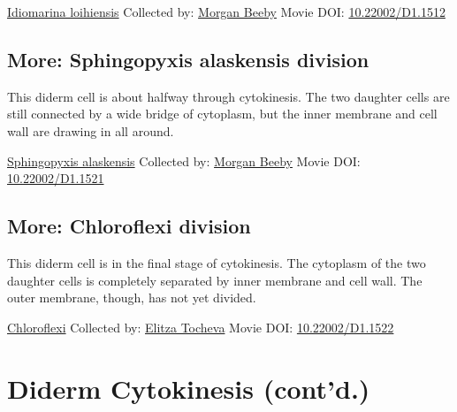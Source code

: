 \documentclass[]{tufte-book}
\begin{document}
\hypertarget{htmlwidget-65a7e8f4d70aea7fb400}{}

\label{fig:5-6}\protect\hyperlink{tree}{Idiomarina loihiensis} Collected by: \protect\hyperlink{morgan_beeby}{Morgan Beeby} Movie DOI: \href{https://doi.org/10.22002/D1.1512}{10.22002/D1.1512}

\hypertarget{Sphingopyxis_alaskensis_division}{%
\subsection*{More: Sphingopyxis alaskensis division}\label{Sphingopyxis_alaskensis_division}}

This diderm cell is about halfway through cytokinesis. The two daughter cells are still connected by a wide bridge of cytoplasm, but the inner membrane and cell wall are drawing in all around.



\hypertarget{htmlwidget-7d0bbe0364d702965563}{}

\label{fig:5-6a}\protect\hyperlink{tree}{Sphingopyxis alaskensis} Collected by: \protect\hyperlink{morgan_beeby}{Morgan Beeby} Movie DOI: \href{https://doi.org/10.22002/D1.1521}{10.22002/D1.1521}

\hypertarget{Chloroflexi_division}{%
\subsection*{More: Chloroflexi division}\label{Chloroflexi_division}}

This diderm cell is in the final stage of cytokinesis. The cytoplasm of the two daughter cells is completely separated by inner membrane and cell wall. The outer membrane, though, has not yet divided.



\hypertarget{htmlwidget-8494c20575473b810694}{}

\label{fig:5-6b}\protect\hyperlink{tree}{Chloroflexi} Collected by: \protect\hyperlink{elitza_tocheva}{Elitza Tocheva} Movie DOI: \href{https://doi.org/10.22002/D1.1522}{10.22002/D1.1522}

\hypertarget{diderm-cytokinesis-contd.}{%
\section{Diderm Cytokinesis (cont'd.)}\label{diderm-cytokinesis-contd.}}
\end{document}
